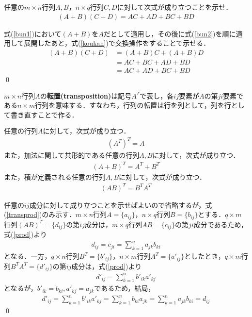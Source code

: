 \begin{qu}
任意の$m\times n$行列$A,B$，$n\times q$行列$C,D$に対して次式が成り立つことを示せ．
\begin{align}
(A+B)(C+D)=AC+AD+BC+BD
\end{align}
\end{qu}
\begin{ans}
式(\ref{bun1})において$(A+B)$を$A$だとして適用し，その後に式(\ref{bun2})を順に適用して展開したあと，式(\ref{koukan})で交換操作をすることで示せる．
\begin{align*}
(A+B)(C+D)&= (A+B)C+(A+B)D\\
&= AC+BC+AD+BD \\
&= AC+AD+BC+BD
\end{align*}\qed
\end{ans}


\begin{defi}[転置]
$m\times n$行列$A$の{\bf 転置(transposition)}は記号$A^T$で表し，各$ij$要素が$A$の第$ji$要素である$n\times m$行列を意味する．すなわち，行列の転置は行を列として，列を行として書き直すことで作る．
\end{defi}

\begin{theo}
任意の行列$A$に対して，次式が成り立つ．
\begin{align}
(A^T)^T=A \label{trans2}
\end{align}
また，加法に関して共形的である任意の行列$A,B$に対して，次式が成り立つ．
\begin{align}
(A+B)^T=A^T+B^T	
\end{align}
また，積が定義される任意の行列$A,B$に対して，次式が成り立つ．
\begin{align}
(AB)^T=B^TA^T \label{transprod}
\end{align}
\end{theo}
\begin{pro}
任意の$ij$成分に対して成り立つことを示せばよいので省略するが，式(\ref{transprod})のみ示す．$m\times n$行列$A=\{a_{ij}\}$，$n\times q$行列$B=\{b_{ij}\}$とする．$q\times m$行列$(AB)^T=\{d_{ij}\}$の第$ij$成分は，$m\times q$行列$AB=\{c_{ij}\}$の第$ji$成分であるため，式(\ref{prod})より
\begin{align*}
d_{ij}=c_{ji}=\sum_{k=1}^n a_{jk}b_{ki}
\end{align*}
となる．一方，$q\times n$行列$B^T=\{b'_{ij}\}$，$n\times m$行列$A^T=\{a'_{ij}\}$としたとき，$q\times m$行列$B^TA^T=\{d'_{ij}\}$の第$ij$成分は，式(\ref{prod})より
\begin{align*}
d'_{ij}=\sum_{k=1}^n b'_{ik}a'_{kj}
\end{align*}
となるが，$b'_{ik}=b_{ki},a'_{kj}=a_{jk}$であるため，結局，
\begin{align*}
d'_{ij}=\sum_{k=1}^n b'_{ik}a'_{kj}=\sum_{k=1}^n b_{ki}a_{jk}=\sum_{k=1}^n a_{jk}b_{ki}=d_{ij}
\end{align*}\qed
\end{pro}

